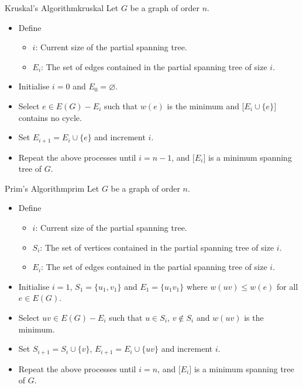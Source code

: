 \documentclass[math]{amznotes}
\theoremstyle{remark}
\begin{document}
\begin{tecbox}{Kruskal's Algorithm}{kruskal}
    Let $G$ be a graph of order $n$. 
    \begin{itemize}
        \item Define 
        \begin{itemize}
            \item $i$: Current size of the partial spanning tree.
            \item $E_i$: The set of edges contained in the partial spanning tree of size $i$.
        \end{itemize}
        \item Initialise $i = 0$ and $E_0 = \varnothing$.
        \item Select $e \in E(G) - E_i$ such that $w(e)$ is the minimum and $\bigl[E_i \cup \{e\}\bigr]$ contains no cycle.
        \item Set $E_{i + 1} = E_i \cup \{e\}$ and increment $i$.
        \item Repeat the above processes until $i = n - 1$, and $\bigl[E_i\bigr]$ is a minimum spanning tree of $G$.
    \end{itemize}
\end{tecbox}
\begin{tecbox}{Prim's Algorithm}{prim}
    Let $G$ be a graph of order $n$. 
    \begin{itemize}
        \item Define 
        \begin{itemize}
            \item $i$: Current size of the partial spanning tree.
            \item $S_i$: The set of vertices contained in the partial spanning tree of size $i$.
            \item $E_i$: The set of edges contained in the partial spanning tree of size $i$.
        \end{itemize}
        \item Initialise $i = 1$, $S_1 = \{u_1, v_1\}$ and $E_1 = \{u_1v_1\}$ where $w(uv) \leq w(e)$ for all $e \in E(G)$.
        \item Select $uv \in E(G) - E_i$ such that $u \in S_i$, $v\notin S_i$ and $w(uv)$ is the minimum.
        \item Set $S_{i + 1} = S_i \cup \{v\}$, $E_{i + 1} = E_i \cup \{uv\}$ and increment $i$.
        \item Repeat the above processes until $i = n$, and $\bigl[E_i\bigr]$ is a minimum spanning tree of $G$.
    \end{itemize}
\end{tecbox}
\end{document}
